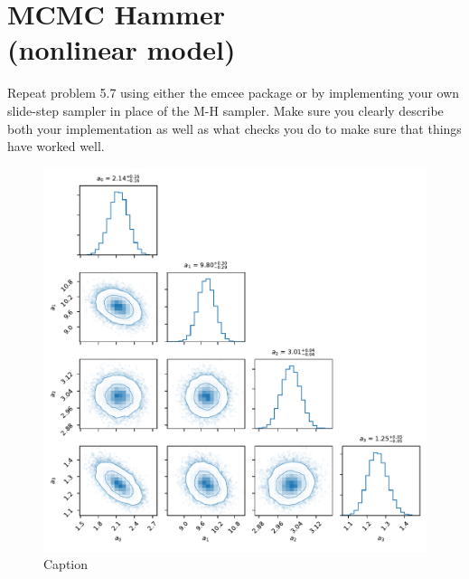 \section{MCMC Hammer \\(nonlinear model)}

Repeat problem 5.7 using either the
emcee package or by implementing your own slide-step sampler in place of the M-H sampler.
Make sure you clearly describe both your implementation as well as what checks you do to make sure that things have worked well.

\begin{figure}
    \centering
    \includegraphics{CodeAndFigures/gaussianModelEmcee.pdf}
    \caption{Caption}
    \label{fig:gaussEmcee}
\end{figure}